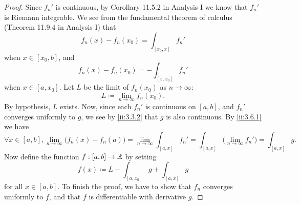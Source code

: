 \begin{proof}
  Since \(f_n'\) is continuous, by Corollary 11.5.2 in Analysis I we know that \(f_n'\) is Riemann integrable.
  We see from the fundamental theorem of calculus (Theorem 11.9.4 in Analysis I) that
  \[
    f_n(x) - f_n(x_0) = \int_{[x_0, x]} f_n'
  \]
  when \(x \in [x_0, b]\), and
  \[
    f_n(x) - f_n(x_0) = -\int_{[x, x_0]} f_n'
  \]
  when \(x \in [a, x_0]\).
  Let \(L\) be the limit of \(f_n(x_0)\) as \(n \to \infty\):
  \[
    L \coloneqq \lim_{n \to \infty} f_n(x_0).
  \]
  By hypothesis, \(L\) exists.
  Now, since each \(f_n'\) is continuous on \([a, b]\), and \(f_n'\) converges uniformly to \(g\), we see by \cref{ii:3.3.2} that \(g\) is also continuous.
  By \cref{ii:3.6.1} we have
  \[
    \forall x \in [a, b], \lim_{n \to \infty} \big(f_n(x) - f_n(a)\big) = \lim_{n \to \infty} \int_{[a, x]} f_n' = \int_{[a, x]} \big(\lim_{n \to \infty} f_n'\big) = \int_{[a, x]} g.
  \]
  Now define the function \(f : [a, b] \to \mathbb{R}\) by setting
  \[
    f(x) \coloneqq L - \int_{[a, x_0]} g + \int_{[a, x]} g
  \]
  for all \(x \in [a, b]\).
  To finish the proof, we have to show that \(f_n\) converges uniformly to \(f\), and that \(f\) is differentiable with derivative \(g\).


\end{proof}
